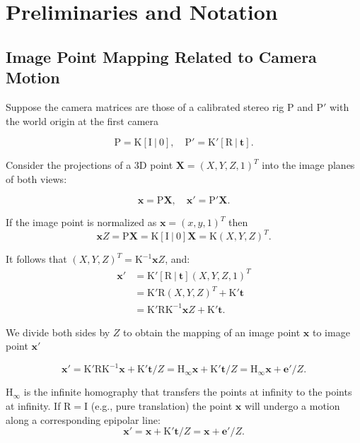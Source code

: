 \section{Preliminaries and Notation}

\subsection{Image Point Mapping Related to Camera Motion}

Suppose the camera matrices are those of a calibrated stereo rig
$\mathrm{P}$ and $\mathrm{P}'$ with the world origin at the first
camera

\begin{equation}
\mathrm{P = K[I\ |\ 0],\quad P'=K'[R\ |\ \mathbf{t}]}.
\end{equation}

Consider the projections of a 3D point $\mathbf{X}=(X,Y,Z,1)^T$ into the image
planes of both views:

\begin{equation}
\mathrm{\mathbf{x} = P\mathbf{X}, \quad \mathbf{x}' = P'\mathbf{X}}.
\end{equation}

If the image point is normalized as $\mathbf{x} = (x,y,1)^T$ then
\[
\mathbf{x}Z = \mathrm{P\mathbf{X} = K[I\ |\ 0]\mathbf{X} = K}(X,Y,Z)^T.
\]

It follows that $(X,Y,Z)^T = \mathrm{K^{-1}}\mathbf{x}Z$, and:
\begin{align}
  \mathbf{x}' &= \mathrm{K'[R\ |\ \mathbf{t}]}(X,Y,Z,1)^T \\
  &= \mathrm{K'R}(X,Y,Z)^T + \mathrm{K'\mathbf{t}}\\
  &= \mathrm{K'RK^{-1}}\mathbf{x}Z + \mathrm{K'\mathbf{t}}.
\end{align}

We divide both sides by $Z$ to obtain the mapping of an image point $\mathbf{x}$ to image point $\mathbf{x}'$

\begin{equation}
  \label{eq:general_point_motion}
  \mathbf{x}' = \mathrm{K'RK^{-1}}\mathbf{x} + \mathrm{K'}\mathbf{t}/Z = \mathrm{H_\infty}\mathbf{x}+ \mathrm{K'}\mathbf{t}/Z = \mathrm{H_\infty}\mathbf{x} + \mathbf{e'}/Z.
\end{equation}

$\mathrm{H_\infty}$ is the infinite homography that transfers the
points at infinity to the points at infinity.  If $\mathrm{R = I}$
(e.g., pure translation) the point $\mathbf{x}$ will undergo a motion
along a corresponding epipolar line:
\begin{equation}
\mathbf{x}' = \mathbf{x}+ \mathrm{K'}\mathbf{t}/Z = \mathbf{x}+\mathbf{e}'/Z.
\end{equation}

